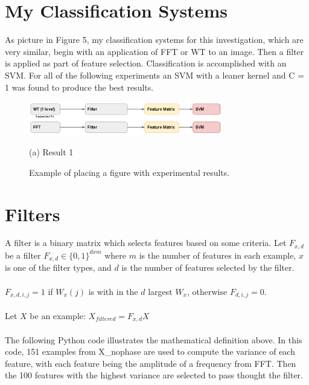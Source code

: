 \documentclass{article}
\begin{document}
\section{My Classification Systems}
\label{sec:system}

As picture in Figure 5, my classification systems for this investigation, 
which are very similar, begin with an application of FFT or WT to an image. 
Then a filter is applied as part of feature selection. Classification is 
accomplished with an SVM. For all of the following experiments an SVM with a 
leaner kernel and C = 1 was found to produce the best results.    

\begin{figure}[htb]

\begin{minipage}[b]{1.0\linewidth}
  \centering
  \centerline{\includegraphics[width=8.5cm]{mysys}}
  \centerline{(a) Result 1}\medskip
\end{minipage}
%
\caption{Example of placing a figure with experimental results.}
\label{fig:res}
%
\end{figure}

\section{Filters}
\label{sec:Filters}

A filter is a binary matrix which selects features based on some criteria. 
Let $F_{x,d}$ be a filter $F_{x,d} \in \{0,1\}^{d x m}$ where $m$ is the number of features in each example, $x$ is one of the filter types, and $d$ is the number of features selected by the filter.
\\\\
$F_{x, d,i,j} = 1$ if $W_{x}(j)$ is with in the $d$ largest $W_{x}$, otherwise $F_{d,i,j} = 0$. 
\\\\
Let $X$ be an example: $X_{filtered} =  F_{x,d}X$
\\\\
The following Python code illustrates the mathematical definition above. In this code, 151 examples from X\_nophase are used to compute the variance of each feature, with each feature being the amplitude of a frequency from FFT. Then the 100 features with the highest 
variance are selected to pass thought the filter. 
    
\end{document}
